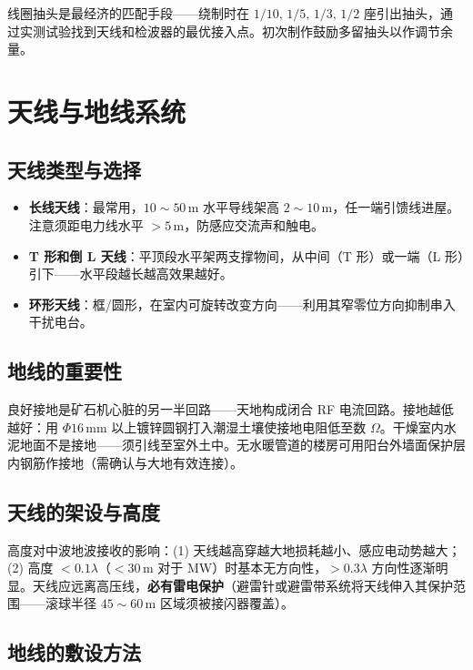 \documentclass[12pt,UTF8]{ctexbook}
\begin{document}
线圈抽头是最经济的匹配手段——绕制时在 $1/10,\,1/5,\,1/3,\,1/2$ 座引出抽头，通过实测试验找到天线和检波器的最优接入点。初次制作鼓励多留抽头以作调节余量。

\section{天线与地线系统}
\label{sec:crystal_antenna_system}

\subsection{天线类型与选择}

\begin{itemize}
  \item \textbf{长线天线}：最常用，$10\sim50\,\mathrm{m}$ 水平导线架高 $2\sim10\,\mathrm{m}$，任一端引馈线进屋。注意须距电力线水平 $>5\,\mathrm{m}$，防感应交流声和触电。
  \item \textbf{T 形和倒 L 天线}：平顶段水平架两支撑物间，从中间（T 形）或一端（L 形）引下——水平段越长越高效果越好。
  \item \textbf{环形天线}：框/圆形，在室内可旋转改变方向——利用其窄零位方向抑制串入干扰电台。
\end{itemize}

\subsection{地线的重要性}

良好接地是矿石机心脏的另一半回路——天地构成闭合 RF 电流回路。接地越低越好：用 $\Phi16\,\mathrm{mm}$ 以上镀锌圆钢打入潮湿土壤使接地电阻低至数 $\Omega$。干燥室内水泥地面不是接地——须引线至室外土中。无水暖管道的楼房可用阳台外墙面保护层内钢筋作接地（需确认与大地有效连接）。

\subsection{天线的架设与高度}

高度对中波地波接收的影响：(1) 天线越高穿越大地损耗越小、感应电动势越大；(2) 高度 $<0.1\lambda$（$<30\,\mathrm{m}$ 对于 MW）时基本无方向性，$>0.3\lambda$ 方向性逐渐明显。天线应远离高压线，\textbf{必有雷电保护}（避雷针或避雷带系统将天线伸入其保护范围——滚球半径 $45\sim60\,\mathrm{m}$ 区域须被接闪器覆盖）。

\subsection{地线的敷设方法}
\end{document}
